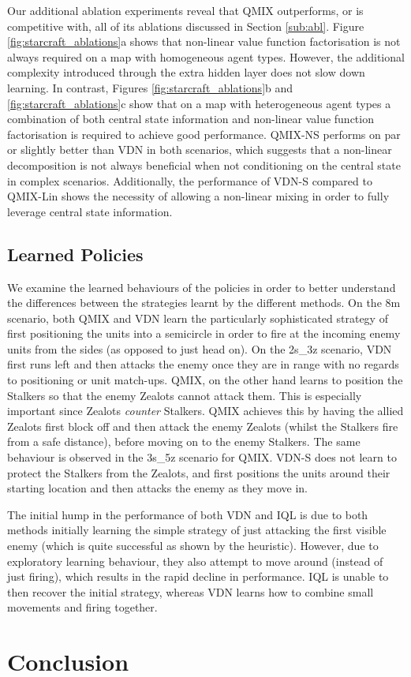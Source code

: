 \documentclass{article}
\begin{document}
Our additional ablation experiments reveal that QMIX outperforms, or is competitive with, all of its ablations discussed in Section \ref{sub:abl}. Figure \ref{fig:starcraft_ablations}a shows that non-linear value function factorisation is not always required on a map with homogeneous agent types. However, the additional complexity introduced through the extra hidden layer does not slow down learning. In contrast, Figures \ref{fig:starcraft_ablations}b and \ref{fig:starcraft_ablations}c show that on a map with heterogeneous agent types a combination of both central state information and non-linear value function factorisation is required to achieve good performance. QMIX-NS performs on par or slightly better than VDN in both scenarios, which suggests that a non-linear decomposition is not always beneficial when not conditioning on the central state in complex scenarios. Additionally, the performance of VDN-S compared to QMIX-Lin shows the necessity of allowing a non-linear mixing in order to fully leverage central state information.



\subsection{Learned Policies}

We examine the learned behaviours of the policies in order to better understand the differences between the strategies learnt by the different methods. 
On the 8m scenario, both QMIX and VDN learn the particularly sophisticated strategy of first positioning the units into a semicircle in order to fire at the incoming enemy units from the sides (as opposed to just head on).
On the 2s\_3z scenario, VDN first runs left and then attacks the enemy once they are in range with no regards to positioning or unit match-ups. QMIX, on the other hand learns to position the Stalkers so that the enemy Zealots cannot attack them. This is especially important since Zealots \emph{counter} Stalkers. QMIX achieves this by having the allied Zealots first block off and then attack the enemy Zealots (whilst the Stalkers fire from a safe distance), before moving on to the enemy Stalkers. The same behaviour is observed in the 3s\_5z scenario for QMIX. VDN-S does not learn to protect the Stalkers from the Zealots, and first positions the units around their starting location and then attacks the enemy as they move in.

The initial hump in the performance of both VDN and IQL is due to both methods initially learning the simple strategy of just attacking the first visible enemy (which is quite successful as shown by the heuristic). However, due to exploratory learning behaviour, they also attempt to move around (instead of just firing), which results in the rapid decline in performance. IQL is unable to then recover the initial strategy, whereas VDN  learns how to combine small movements and firing together. \section{Conclusion}
\end{document}
